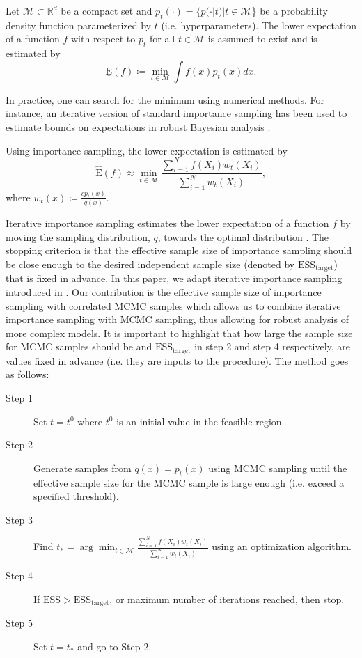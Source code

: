 \documentclass{amsart}
\theoremstyle{plain}%
\begin{document}
Let $\mathcal{M} \subset \mathbb{R}^d$ be a compact set and $p_t(\cdot) = \{p(\cdot|t)| t \in  \mathcal{M}$\} be a probability density function parameterized  by $t$ (i.e. hyperparameters).
The lower expectation of a function $f$ with respect to $p_t$ for all $t \in  \mathcal{M}$ 
is assumed to exist and is estimated by
\begin{equation}
\underline{\mathrm{E}}(f) \coloneqq \displaystyle \min_{t \in \mathcal{M}} \int f(x)p_t(x) dx. \label{Lower_Expectation}
\end{equation}

In practice, one can search for the minimum
using numerical methods. For instance, an iterative version of standard importance sampling has been used to estimate bounds on expectations in robust Bayesian analysis \citep{Fetz_2017,Troffaes_2017,Troffaes_2018,Fetz_2018}.

Using importance sampling, the lower expectation is estimated by 
\begin{equation}
\underline{\widehat{\mathrm{E}}}(f)  \approx \displaystyle \min_{t \in \mathcal{M}} \frac{\sum_{i=1}^N f(X_i)w_t(X_i)}{\sum_{i=1}^N w_t(X_i)}, \label{Lower_Expectation_IS}
\end{equation}
where $w_t(x) \coloneqq \frac{c p_t(x)}{q(x)}$.

Iterative importance sampling estimates the lower expectation 
of a function $f$ by moving the sampling distribution, $q$, towards the optimal distribution 
\citep{Fetz_2017,Troffaes_2017}. The stopping criterion is that the effective sample size of importance sampling 
should be close enough to the desired independent sample size (denoted by $\mathrm{ESS_{target}}$) that is fixed in advance.
In this paper, we adapt iterative importance sampling introduced in \citep{Fetz_2017,Troffaes_2017,Troffaes_2018}. 
Our contribution is the effective sample size of importance sampling with correlated MCMC samples which allows us to combine iterative importance sampling with MCMC sampling, thus allowing for robust analysis of more complex models. 
It is important to highlight that how large the sample size for MCMC samples should be and $\mathrm{ESS_{target}}$ in step 2 and step 4 respectively, are values fixed in advance (i.e. they are inputs to the procedure).
The method goes as follows:

\begin{description}
\item[Step 1] Set $t = t^0$ where $t^0$ is an initial value in the feasible region.
\item[Step 2] Generate samples from $q(x) = p_t(x)$ using MCMC sampling until the effective sample size for the MCMC sample is large enough (i.e. exceed a specified threshold). 
\item[Step 3] Find $t_* = \arg \min_{t \in \mathcal{M}} \frac{\sum_{i=1}^N f(X_i)w_t(X_i)}{\sum_{i=1}^N w_t(X_i)}$ using an optimization algorithm.
\item[Step 4] If $\mathrm{ESS} > \mathrm{ESS_{target}}$, or maximum number of iterations reached, then stop.
\item[Step 5] Set $t = t_*$ and go to Step 2.
\end{description}
\end{document}
